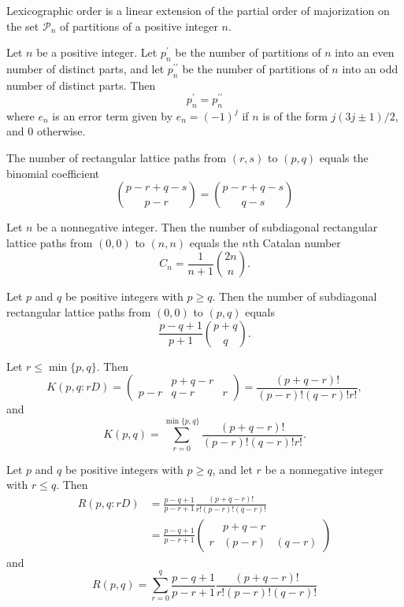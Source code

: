 \begin{theorem}
  \label{thm:8.3.5}
  Lexicographic order is a linear extension of the partial order of majorization on the set 
  $\mathcal{P}_n$ of partitions of a positive integer $n$.
\end{theorem}

\begin{theorem}
  \label{thm:8.3.6}
  Let $n$ be a positive integer. Let $p_n^{\prime}$ be the number of partitions of $n$ into an even 
  number of distinct parts, and let $p_n^{\prime\prime}$ be the number of partitions of $n$ into an 
  odd number of distinct parts. Then
  \[ p_n^{\prime} = p_n^{\prime\prime} \]
  where $e_n$ is an error term given by $e_n = (-1)^j$ if $n$ is of the form $j(3j\pm 1)/2$, and 0 
  otherwise.
\end{theorem}

\begin{theorem}
  \label{thm:8.5.1}
  The number of rectangular lattice paths from $(r, s)$ to $(p, q)$ equals the binomial coefficient
  \[ \binom{p-r+q-s}{p-r} = \binom{p-r+q-s}{q-s} \]
\end{theorem}

\begin{theorem}
  \label{thm:8.5.2}
  Let $n$ be a nonnegative integer. Then the number of subdiagonal rectangular lattice paths from 
  $(0,0)$ to $(n, n)$ equals the $n$th Catalan number
  \[ C_n = \frac{1}{n+1}\binom{2n}{n}. \]
\end{theorem}

\begin{theorem}
  \label{thm:8.5.3}
  Let $p$ and $q$ be positive integers with $p \geq q$. Then the number of subdiagonal rectangular 
  lattice paths from $(0,0)$ to $(p, q)$ equals
  \[ \frac{p-q+1}{p+1}\binom{p+q}{q}. \]
\end{theorem}

\begin{theorem}
  \label{thm:8.5.4}
  Let $r \leq \min\{p, q\}$. Then 
  \[ K(p, q : rD) = \begin{pmatrix} & p+q-r & \\ p-r & q-r & r \end{pmatrix} = \frac{(p+q-r)!}{(p-r)!(q-r)!r!}, \]
  and 
  \[ K(p,q) = \sum\limits_{r=0}^{\min\{p, q\}}\frac{(p+q-r)!}{(p-r)!(q-r)!r!}. \]
\end{theorem}

\begin{theorem}
  \label{thm:8.5.5}
  Let $p$ and $q$ be positive integers with $p \geq q$, and let $r$ be a nonnegative integer with 
  $r \leq q$. Then
  \begin{align*}
    R(p, q : rD) &= \frac{p-q+1}{p-r+1}\frac{(p+q-r)!}{r!(p-r)!(q-r)!} \\
    &= \frac{p-q+1}{p-r+1}
      \begin{pmatrix}
         & p+q-r & \\
        r & (p-r) & (q-r)
      \end{pmatrix}
  \end{align*}
  and
  \[R(p, q)=\sum\limits_{r=0}^q \frac{p-q+1}{p-r+1} \frac{(p+q-r)!}{r!(p-r)!(q-r)!}\]
\end{theorem}

